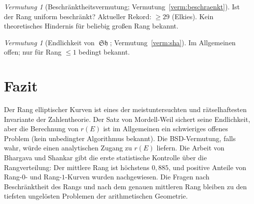 \documentclass[12pt,a4paper]{amsart}
\theoremstyle{definition}
\theoremstyle{remark}
\newtheorem{vermutung}[theorem]{Vermutung}
\DeclareMathOperator{\Sha}{\mathfrak{Sh}}
\begin{document}
\begin{vermutung}[Beschränktheitsvermutung; Vermutung~\ref{verm:beschraenkt}]
  Ist der Rang uniform beschränkt?
  Aktueller Rekord: $\geq 29$ (Elkies).
  Kein theoretisches Hindernis für beliebig großen Rang bekannt.
\end{vermutung}

\begin{vermutung}[Endlichkeit von $\Sha$; Vermutung~\ref{verm:sha}]
  Im Allgemeinen offen; nur für Rang $\leq 1$ bedingt bekannt.
\end{vermutung}

\section{Fazit}\label{sec:fazit}

Der Rang elliptischer Kurven ist eines der meistuntersuchten und rätselhaftesten
Invariante der Zahlentheorie. Der Satz von Mordell-Weil sichert seine Endlichkeit,
aber die Berechnung von $r(E)$ ist im Allgemeinen ein schwieriges offenes Problem
(kein unbedingter Algorithmus bekannt). Die BSD-Vermutung, falls wahr, würde einen
analytischen Zugang zu $r(E)$ liefern. Die Arbeit von Bhargava und Shankar gibt die
erste statistische Kontrolle über die Rangverteilung: Der mittlere Rang ist höchstens
$0{,}885$, und positive Anteile von Rang-$0$- und Rang-$1$-Kurven wurden nachgewiesen.
Die Fragen nach Beschränktheit des Rangs und nach dem genauen mittleren Rang
bleiben zu den tiefsten ungelösten Problemen der arithmetischen Geometrie.
\end{document}
